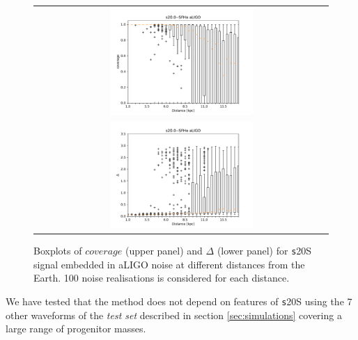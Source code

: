 \begin{figure}
  \centering
  \begin{tabular}{c}
    \includegraphics[width=0.5\textwidth]{plots/s20--SFHo_covpbb_boxplot_aLIGO} \\
    \includegraphics[width=0.5\textwidth]{plots/s20--SFHo_error_boxplot_aLIGO} \\
  \end{tabular}
    
 \caption{Boxplots of $coverage$ (upper panel) and $\Delta$ (lower panel) for {\texttt s20S} signal embedded in aLIGO noise at different distances from the Earth. 100 noise realisations is considered for each distance.}
  \label{fig:s20results}
\end{figure}

We have tested that the method does not depend on features of {\texttt s20S} using the 7
other waveforms of the {\it test set} described in section \ref{sec:simulations} covering
a large range of progenitor masses.

